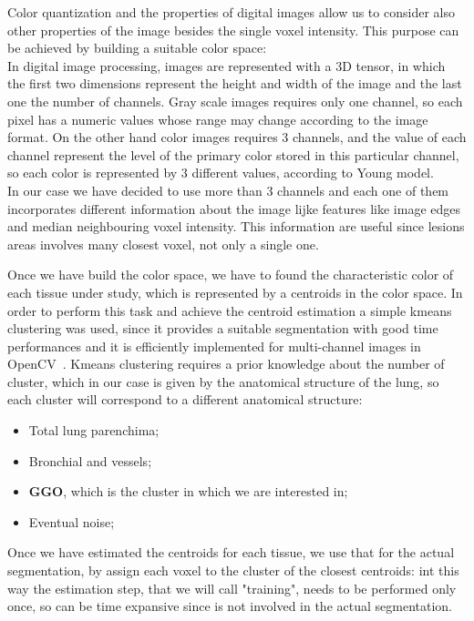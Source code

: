 \documentclass{standalone}
\begin{document}
	Color quantization and the properties of digital images allow us to consider also other properties of the image besides the single voxel intensity.
	This purpose can be achieved by building a suitable color space: \\
	In digital image processing, images are represented with a 3D tensor, in which the first two dimensions represent the height and width of the image 
	and the last one the number of channels. Gray scale images requires only one channel, so each pixel has a numeric values whose range may change 
	according to the image format. On the other hand color images requires 3 channels, and the value of each channel represent the level of the primary 
	color stored in this particular channel, so each color is represented by 3 different values, according to Young model. \\
	In our case we have decided to use more than 3 channels and each one of them incorporates different information about the image lijke 
	features like image edges and median neighbouring voxel intensity. This information are useful since lesions areas involves many closest voxel, not only a single one.
	
	Once we have build the color space, we have to found the characteristic color of each tissue under study, which is represented by a centroids in the color space. In order to perform this task and achieve the centroid estimation a simple kmeans clustering was used, since it provides a suitable segmentation with good time performances and it is efficiently implemented for multi-channel images in OpenCV~\cite{OpenCV}. 
	Kmeans clustering requires a prior knowledge about the number of cluster, which in our case is given by the anatomical structure of the lung, so each cluster will correspond to a different anatomical structure: 
	\begin{itemize}
		\item Total lung parenchima;
		\item Bronchial and vessels;
		\item \textbf{GGO}, which is the cluster in which we are interested in;
		\item Eventual noise;
	\end{itemize}

	
	Once we have estimated the centroids for each tissue, we use that for the actual segmentation, by assign each voxel to the cluster of the closest centroids: int this way the estimation step, that we will call "training", needs to be performed only once, so can be time expansive since is not involved in the actual segmentation.\\


	
	
	
	

	
	
\end{document}
